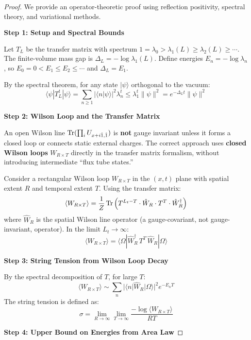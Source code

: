 \begin{proof}
We provide an operator-theoretic proof using reflection positivity, 
spectral theory, and variational methods.

\textbf{Step 1: Setup and Spectral Bounds}

Let $T_L$ be the transfer matrix with spectrum $1 = \lambda_0 > \lambda_1(L) \geq \lambda_2(L) \geq \cdots$.
The finite-volume mass gap is $\Delta_L = -\log\lambda_1(L)$. Define energies $E_n = -\log\lambda_n$, 
so $E_0 = 0 < E_1 \leq E_2 \leq \cdots$ and $\Delta_L = E_1$.

By the spectral theorem, for any state $|\psi\rangle$ orthogonal to the vacuum:
\[
\langle \psi | T_L^t | \psi \rangle = \sum_{n \geq 1} |\langle n | \psi \rangle|^2 \lambda_n^t
\leq \lambda_1^t \|\psi\|^2 = e^{-\Delta_L t} \|\psi\|^2
\]

\textbf{Step 2: Wilson Loop and the Transfer Matrix}

\begin{tcolorbox}[colback=yellow!5, colframe=yellow!75!black, title=\textbf{Gauge Invariance Note}]
An open Wilson line $\operatorname{Tr}(\prod_i U_{x+i\hat{1}, \hat{1}})$ is \textbf{not} 
gauge invariant unless it forms a closed loop or connects static external charges.
The correct approach uses \textbf{closed Wilson loops} $W_{R \times T}$ directly 
in the transfer matrix formalism, without introducing intermediate ``flux tube states.''
\end{tcolorbox}

Consider a rectangular Wilson loop $W_{R \times T}$ in the $(x, t)$ plane with 
spatial extent $R$ and temporal extent $T$. Using the transfer matrix:
\[
\langle W_{R \times T} \rangle = \frac{1}{Z} \operatorname{Tr}\left(T^{L_t - T} \cdot \hat{W}_R \cdot T^T \cdot \hat{W}_R^\dagger\right)
\]
where $\hat{W}_R$ is the spatial Wilson line operator (a gauge-covariant, not 
gauge-invariant, operator). In the limit $L_t \to \infty$:
\[
\langle W_{R \times T} \rangle = \langle \Omega | \hat{W}_R^\dagger \, T^T \, \hat{W}_R | \Omega \rangle
\]

\textbf{Step 3: String Tension from Wilson Loop Decay}

By the spectral decomposition of $T$, for large $T$:
\[
\langle W_{R \times T} \rangle \sim \sum_n |\langle n | \hat{W}_R | \Omega \rangle|^2 e^{-E_n T}
\]
The string tension is defined as:
\[
\sigma = \lim_{R \to \infty} \lim_{T \to \infty} \frac{-\log\langle W_{R \times T}\rangle}{RT}
\]

\textbf{Step 4: Upper Bound on Energies from Area Law}


\end{proof}
